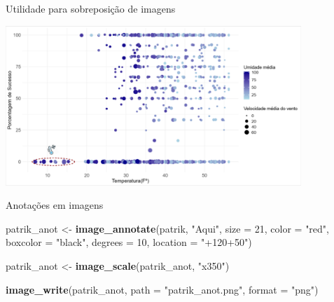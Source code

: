 \documentclass[
  ignorenonframetext,
]{beamer}
\newenvironment{Shaded}{\begin{snugshade}}{\end{snugshade}}
\newcommand{\DataTypeTok}[1]{\textcolor[rgb]{0.13,0.29,0.53}{#1}}
\newcommand{\DecValTok}[1]{\textcolor[rgb]{0.00,0.00,0.81}{#1}}
\newcommand{\KeywordTok}[1]{\textcolor[rgb]{0.13,0.29,0.53}{\textbf{#1}}}
\newcommand{\NormalTok}[1]{#1}
\newcommand{\StringTok}[1]{\textcolor[rgb]{0.31,0.60,0.02}{#1}}
\begin{document}
\begin{frame}{Utilidade para sobreposição de imagens}
\protect\hypertarget{utilidade-para-sobreposiuxe7uxe3o-de-imagens-1}{}

\includegraphics[width=4.4in]{juntos2}

\begin{center}
\tiny{}
\end{center}

\end{frame}

\begin{frame}[fragile]{Anotações em imagens}
\protect\hypertarget{anotauxe7uxf5es-em-imagens}{}

\begin{Shaded}
\begin{Highlighting}[]
\NormalTok{patrik_anot <-}\StringTok{ }\KeywordTok{image_annotate}\NormalTok{(patrik, }\StringTok{"Aqui"}\NormalTok{, }\DataTypeTok{size =} \DecValTok{21}\NormalTok{,}
                             \DataTypeTok{color =} \StringTok{"red"}\NormalTok{,}
                             \DataTypeTok{boxcolor =} \StringTok{"black"}\NormalTok{,}
                             \DataTypeTok{degrees =} \DecValTok{10}\NormalTok{, }
                             \DataTypeTok{location =} \StringTok{"+120+50"}\NormalTok{)}

\NormalTok{patrik_anot <-}\StringTok{ }\KeywordTok{image_scale}\NormalTok{(patrik_anot, }\StringTok{"x350"}\NormalTok{)}

\KeywordTok{image_write}\NormalTok{(patrik_anot, }\DataTypeTok{path =} \StringTok{"patrik_anot.png"}\NormalTok{,}
            \DataTypeTok{format =} \StringTok{"png"}\NormalTok{)}
\end{Highlighting}
\end{Shaded}

\end{frame}
\end{document}
